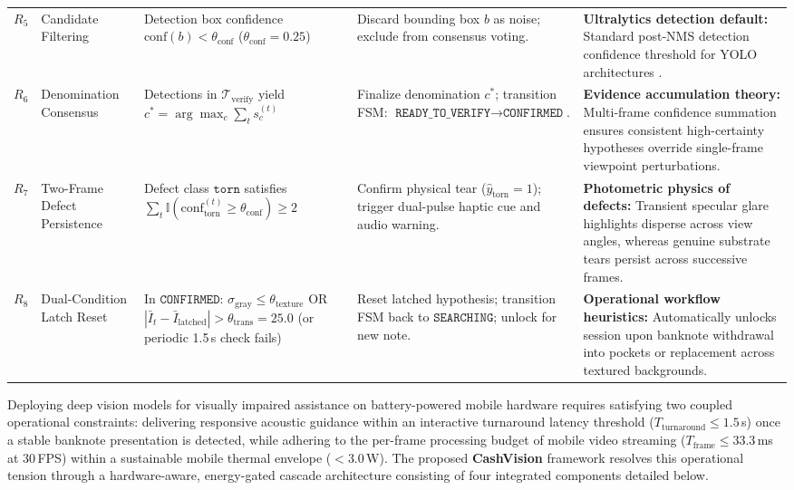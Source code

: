 \documentclass[final,5p,times,twocolumn,authoryear]{elsarticle}
\begin{document}
\begin{table}[t]
\begin{tabularx}{\textwidth}{lp{2.6cm}p{4.2cm}p{4cm}p{6cm}}
$R_5$ & Candidate Filtering & Detection box confidence $\text{conf}(b) < \theta_{\text{conf}}$ ($\theta_{\text{conf}} = 0.25$) & Discard bounding box $b$ as noise; exclude from consensus voting. & \textbf{Ultralytics detection default:} Standard post-NMS detection confidence threshold for YOLO architectures \cite{Jocher2023}. \\
$R_6$ & Denomination Consensus & Detections in $\mathcal{T}_{\text{verify}}$ yield \newline $c^* = \arg\max_c \sum_{t} s_c^{(t)}$ & Finalize denomination $c^*$; transition FSM: $\texttt{READY\_TO\_VERIFY} \to \texttt{CONFIRMED}$. & \textbf{Evidence accumulation theory:} Multi-frame confidence summation ensures consistent high-certainty hypotheses override single-frame viewpoint perturbations. \\
$R_7$ & Two-Frame Defect Persistence & Defect class $\texttt{torn}$ satisfies \newline $\sum_{t} \mathbb{I}(\text{conf}_{\text{torn}}^{(t)} \ge \theta_{\text{conf}}) \ge 2$ & Confirm physical tear ($\hat{y}_{\text{torn}} = 1$); trigger dual-pulse haptic cue and audio warning. & \textbf{Photometric physics of defects:} Transient specular glare highlights disperse across view angles, whereas genuine substrate tears persist across successive frames. \\
$R_8$ & Dual-Condition Latch Reset & In $\texttt{CONFIRMED}$: $\sigma_{\text{gray}} \le \theta_{\text{texture}}$ OR $|\bar{I}_t - \bar{I}_{\text{latched}}| > \theta_{\text{trans}} = 25.0$ (or periodic 1.5\,s check fails) & Reset latched hypothesis; transition FSM back to $\texttt{SEARCHING}$; unlock for new note. & \textbf{Operational workflow heuristics:} Automatically unlocks session upon banknote withdrawal into pockets or replacement across textured backgrounds. \\
\bottomrule
\end{tabularx}
\end{table}

Deploying deep vision models for visually impaired assistance on battery-powered mobile hardware requires satisfying two coupled operational constraints: delivering responsive acoustic guidance within an interactive turnaround latency threshold ($T_{\text{turnaround}} \le 1.5$\,s) \cite{Nielsen1993,Miller1968} once a stable banknote presentation is detected, while adhering to the per-frame processing budget of mobile video streaming ($T_{\text{frame}} \le 33.3$\,ms at $30$\,FPS) within a sustainable mobile thermal envelope ($<3.0$\,W). The proposed \textbf{CashVision} framework resolves this operational tension through a hardware-aware, energy-gated cascade architecture consisting of four integrated components detailed below.
\end{document}
